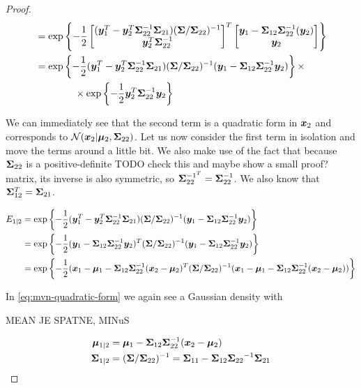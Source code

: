 \begin{proof}
\begin{align}
        &= \exp \left\lbrace -\frac{1}{2}
        \begin{bmatrix} ({\bm{y}}_1^T - {\bm{y}}_2^T {\bm{\Sigma}}_{22}^{-1} {\bm{\Sigma}}_{21}) ({\bm{\Sigma}}/{\bm{\Sigma}}_{22})^{-1} \\
        {\bm{y}}_2^T {\bm{\Sigma}}_{22}^{-1}
        \end{bmatrix}^T
        \begin{bmatrix} {\bm{y}}_1 -{\bm{\Sigma}}_{12} {\bm{\Sigma}}_{22}^{-1} ({\bm{y}}_2) \\ {\bm{y}}_2 \end{bmatrix}
        \right\rbrace \\
        &= \exp \left\lbrace -\frac{1}{2}
        ({\bm{y}}_1^T - {\bm{y}}_2^T {\bm{\Sigma}}_{22}^{-1} {\bm{\Sigma}}_{21}) ({\bm{\Sigma}}/{\bm{\Sigma}}_{22})^{-1} ({\bm{y}}_1 -{\bm{\Sigma}}_{12} {\bm{\Sigma}}_{22}^{-1} {\bm{y}}_2)
        \right\rbrace \times \\
        & \qquad\qquad \times \exp \left\lbrace -\frac{1}{2} {\bm{y}}_2^T {\bm{\Sigma}}_{22}^{-1} {\bm{y}}_2 \right\rbrace \nonumber
    \end{align}

    We can immediately see that the second term is a quadratic form in ${\bm{x}}_2$
    and corresponds to ${\mathcal{N}}({\bm{x}}_2 | {\bm{\mu}}_2, {\bm{\Sigma}}_{22})$. Let us now consider
    the first term in isolation and move the terms around a little bit. We also
    make use of the fact that because ${\bm{\Sigma}}_{22}$ is a positive-definite
    {TODO check this and maybe show a small proof?} matrix, its inverse is also
    symmetric, so ${\bm{\Sigma}}^{-1^T}_{22} = {\bm{\Sigma}}^{-1}_{22}$. We also know that
    ${\bm{\Sigma}}^T_{12} = {\bm{\Sigma}}_{21}$.

    \begin{align}
        E_{1|2} &= \exp \left\lbrace -\frac{1}{2}
        ({\bm{y}}_1^T - {\bm{y}}_2^T {\bm{\Sigma}}_{22}^{-1} {\bm{\Sigma}}_{21}) ({\bm{\Sigma}}/{\bm{\Sigma}}_{22})^{-1} ({\bm{y}}_1 -{\bm{\Sigma}}_{12} {\bm{\Sigma}}_{22}^{-1} {\bm{y}}_2) \right\rbrace \\
        &= \exp \left\lbrace -\frac{1}{2}
        ({\bm{y}}_1 - {\bm{\Sigma}}_{12}{\bm{\Sigma}}_{22}^{-1} {\bm{y}}_2)^T ({\bm{\Sigma}}/{\bm{\Sigma}}_{22})^{-1} ({\bm{y}}_1 -{\bm{\Sigma}}_{12} {\bm{\Sigma}}_{22}^{-1} {\bm{y}}_2) \right\rbrace \\
        &= \exp \left\lbrace -\frac{1}{2}
        ({\bm{x}}_1 - {\bm{\mu}}_1 - {\bm{\Sigma}}_{12}{\bm{\Sigma}}_{22}^{-1} ({\bm{x}}_2 - {\bm{\mu}}_2)^T ({\bm{\Sigma}}/{\bm{\Sigma}}_{22})^{-1} ({\bm{x}}_1 - {\bm{\mu}}_1 -{\bm{\Sigma}}_{12} {\bm{\Sigma}}_{22}^{-1} ({\bm{x}}_2 - {\bm{\mu}}_2)) \right\rbrace \label{eq:mvn-quadratic-form-12}
    \end{align}

    In \eqref{eq:mvn-quadratic-form} we again see a Gaussian density with

    MEAN JE SPATNE, MINuS

    \begin{align}
        {\bm{\mu}}_{1|2} &= {\bm{\mu}}_1 - {\bm{\Sigma}}_{12}{\bm{\Sigma}}_{22}^{-1} ({\bm{x}}_2 - {\bm{\mu}}_2) \\
        {\bm{\Sigma}}_{1|2} &= ({\bm{\Sigma}}/{\bm{\Sigma}}_{22})^{-1} =  {{\bm{\Sigma}}_{11}} - {{\bm{\Sigma}}_{12}} {{\bm{\Sigma}}_{22}}^{-1} {{\bm{\Sigma}}_{21}}
    \end{align}
\end{proof}



